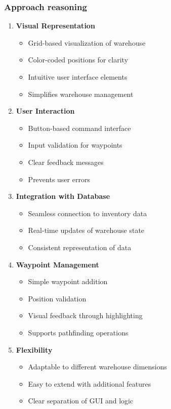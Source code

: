 \subsubsection{Approach reasoning}
\begin{enumerate}
\def\labelenumi{\arabic{enumi}.}
\tightlist
\item
  \textbf{Visual Representation}

  \begin{itemize}
  \tightlist
  \item
    Grid-based visualization of warehouse
  \item
    Color-coded positions for clarity
  \item
    Intuitive user interface elements
  \item
    Simplifies warehouse management
  \end{itemize}
\item
  \textbf{User Interaction}

  \begin{itemize}
  \tightlist
  \item
    Button-based command interface
  \item
    Input validation for waypoints
  \item
    Clear feedback messages
  \item
    Prevents user errors
  \end{itemize}
\item
  \textbf{Integration with Database}

  \begin{itemize}
  \tightlist
  \item
    Seamless connection to inventory data
  \item
    Real-time updates of warehouse state
  \item
    Consistent representation of data
  \end{itemize}
\item
  \textbf{Waypoint Management}

  \begin{itemize}
  \tightlist
  \item
    Simple waypoint addition
  \item
    Position validation
  \item
    Visual feedback through highlighting
  \item
    Supports pathfinding operations
  \end{itemize}
\item
  \textbf{Flexibility}

  \begin{itemize}
  \tightlist
  \item
    Adaptable to different warehouse dimensions
  \item
    Easy to extend with additional features
  \item
    Clear separation of GUI and logic
  \end{itemize}
\end{enumerate}

